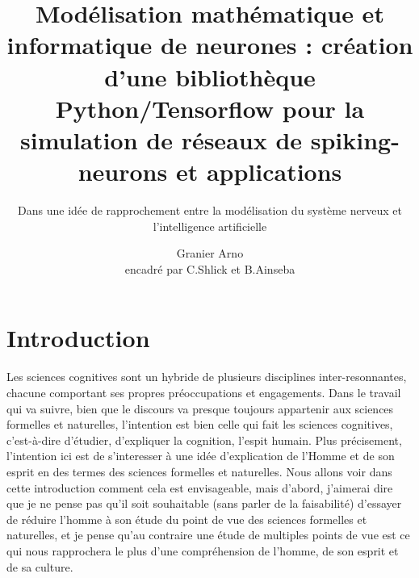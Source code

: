 \documentclass[12pt]{scrartcl}
\title{Modélisation mathématique et informatique de neurones : création d'une bibliothèque Python/Tensorflow pour la simulation de réseaux de spiking-neurons et applications }
\subtitle{Dans une idée de rapprochement entre la modélisation du système nerveux et l'intelligence artificielle}
\author{Granier Arno \\ encadré par C.Shlick et B.Ainseba}
\begin{document}
\maketitle

\tableofcontents

\pagebreak


\part{Introduction}
	

	 Les sciences cognitives sont un hybride de plusieurs disciplines inter-resonnantes, chacune comportant ses propres préoccupations et engagements. Dans le travail qui va suivre, bien que le discours va presque toujours appartenir aux sciences formelles et naturelles, l'intention est bien celle qui fait les sciences cognitives, c'est-à-dire d'étudier, d'expliquer la cognition, l'espit humain. Plus précisement, l'intention ici est de s'interesser à une idée d'explication de l'Homme et de son esprit en des termes des sciences formelles et naturelles. Nous allons voir dans cette introduction comment cela est envisageable, mais d'abord, j'aimerai dire que je ne pense pas qu'il soit souhaitable (sans parler de la faisabilité) d'essayer de réduire l'homme à son étude du point de vue des sciences formelles et naturelles, et je pense qu'au contraire une étude de multiples points de vue est ce qui nous rapprochera le plus d'une compréhension de l'homme, de son esprit et de sa culture.
\end{document}
